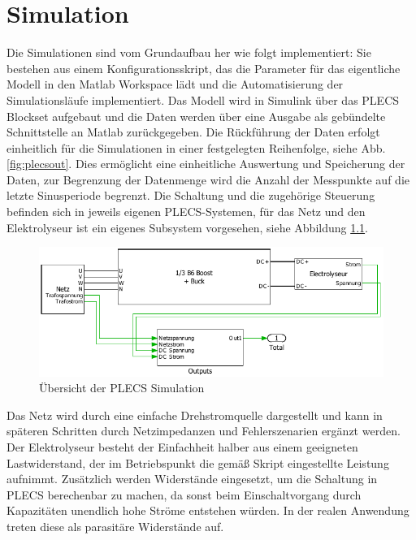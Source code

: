 \chapter{Simulation}
Die Simulationen sind vom Grundaufbau her wie folgt implementiert: Sie bestehen aus einem Konfigurationsskript, das die Parameter für das eigentliche Modell in den Matlab Workspace lädt und die Automatisierung der Simulationsläufe implementiert. Das Modell wird in Simulink über das PLECS Blockset aufgebaut und die Daten werden über eine Ausgabe als gebündelte Schnittstelle an Matlab zurückgegeben. Die Rückführung der Daten erfolgt einheitlich für die Simulationen in einer festgelegten Reihenfolge, siehe Abb. \ref{fig:plecsout}. Dies ermöglicht eine einheitliche Auswertung und Speicherung der Daten, zur Begrenzung der Datenmenge wird die Anzahl der Messpunkte auf die letzte Sinusperiode begrenzt. Die Schaltung und die zugehörige Steuerung befinden sich in jeweils eigenen PLECS-Systemen, für das Netz und den Elektrolyseur ist ein eigenes Subsystem vorgesehen, siehe Abbildung \ref{fig:plecssimulationsaufbau}.
\begin{figure} [H]
\centering
\includegraphics[width=1\linewidth]{content/Grafiken/PLECS_Simulationsaufbau}
\caption{Übersicht der PLECS Simulation}
\label{fig:plecssimulationsaufbau}
\end{figure}
Das Netz wird durch eine einfache Drehstromquelle dargestellt und kann in späteren Schritten durch Netzimpedanzen und Fehlerszenarien ergänzt werden. Der Elektrolyseur besteht der Einfachheit halber aus einem geeigneten Lastwiderstand, der im Betriebspunkt die gemäß Skript eingestellte Leistung aufnimmt. Zusätzlich werden Widerstände eingesetzt, um die Schaltung in \gls{PLECS} berechenbar zu machen, da sonst beim Einschaltvorgang durch Kapazitäten unendlich hohe Ströme entstehen würden. In der realen Anwendung treten diese als parasitäre Widerstände auf.
